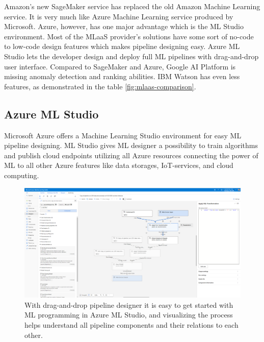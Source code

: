Amazon's new SageMaker service
has replaced the old Amazon Machine Learning service.
It is very much like Azure Machine Learning service
produced by Microsoft.
Azure, however,
has one major advantage
which is the ML Studio environment.
Most of the MLaaS provider's solutions
have some sort of no-code to low-code design features
which makes pipeline designing easy.
Azure ML Studio lets the developer design and deploy
full ML pipelines with drag-and-drop user interface.
Compared to SageMaker and Azure,
Google AI Platform is missing anomaly detection and ranking abilities.
IBM Watson has even less features,
as demonstrated in the table \ref{fig:mlaas-comparison}.\cite{altexsoft2021mlaas}


\subsection{Azure ML Studio}\label{subsec:bg-azure-ml-studio-algorithms}

Microsoft Azure offers a Machine Learning Studio environment
for easy ML pipeline designing.
ML Studio gives ML designer a possibility to
train algorithms and publish cloud endpoints
utilizing all Azure resources
connecting the power of ML
to all other Azure features
like data storages, IoT-services, and cloud computing.\cite{altexsoft2021mlaas,microsoft2022azureml}

\begin{figure}[htb]
    \centering
    \includegraphics[width=150mm]{./appendices/azure-ml-studio-example}
    \caption{With drag-and-drop pipeline designer
    it is easy to get started with ML programming in Azure ML Studio,
        and visualizing the process helps understand all pipeline components
        and their relations to each other.
    \label{fig:azure-ml-studio-example}}
\end{figure}

